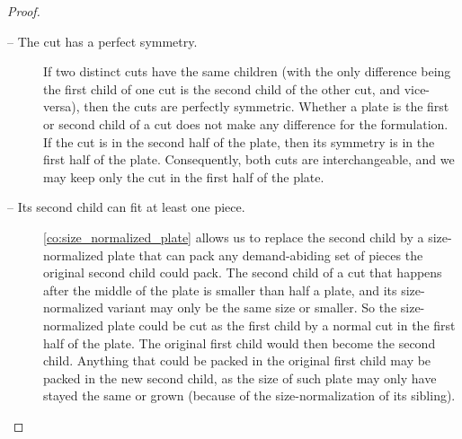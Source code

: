 \begin{proof}
\begin{description}
\item[ -- The cut has a perfect symmetry.]
If two distinct cuts have the same children (with the only difference being the first child of one cut is the second child of the other cut, and vice-versa), then the cuts are perfectly symmetric.
Whether a plate is the first or second child of a cut does not make any difference for the formulation.
If the cut is in the second half of the plate, then its symmetry is in the first half of the plate.
Consequently, both cuts are interchangeable, and we may keep only the cut in the first half of the plate.
\item[ -- Its second child can fit at least one piece.]
\autoref{co:size_normalized_plate} allows us to replace the second child by a size-normalized plate that can pack any demand-abiding set of pieces the original second child could pack.
The second child of a cut that happens after the middle of the plate is smaller than half a plate, and its size-normalized variant may only be the same size or smaller.
So the size-normalized plate could be cut as the first child by a normal cut in the first half of the plate.
The original first child would then become the second child.
Anything that could be packed in the original first child may be packed in the new second child, as the size of such plate may only have stayed the same or grown (because of the size-normalization of its sibling).


\end{description}
\end{proof}
